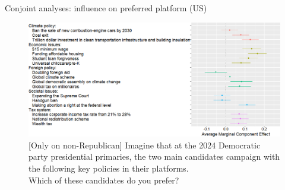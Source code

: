 \begin{framefont}{\small}
\begin{frame}{Conjoint analyses: influence on preferred platform (US)\label{}} 
    \bbvs \ip {}
    \ee
    \begin{figure}\vspace{-.4cm}
        \centering 
        \caption{[Only on non-Republican] Imagine that at the 2024 Democratic party presidential primaries, the two main candidates campaign with the following key policies in their platforms.\\
		Which of these candidates do you prefer?}
        \vspace{-.2cm} 
        \includegraphics[height=.7\textheight]{../figures/US1/ca_r.png} 
    \end{figure}
\end{frame}


\end{framefont}

